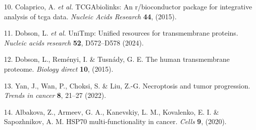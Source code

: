 \documentclass[
]{article}
\newenvironment{cslreferences}%
  {}%
  {\par}
\begin{document}
\begin{cslreferences}
\leavevmode\hypertarget{ref-TcgabiolinksAColapr2015}{}%
10. Colaprico, A. \emph{et al.} TCGAbiolinks: An r/bioconductor package for integrative analysis of tcga data. \emph{Nucleic Acids Research} \textbf{44}, (2015).

\leavevmode\hypertarget{ref-UnitmpUnifiedDobson2024}{}%
11. Dobson, L. \emph{et al.} UniTmp: Unified resources for transmembrane proteins. \emph{Nucleic acids research} \textbf{52}, D572--D578 (2024).

\leavevmode\hypertarget{ref-TheHumanTransDobson2015}{}%
12. Dobson, L., Reményi, I. \& Tusnády, G. E. The human transmembrane proteome. \emph{Biology direct} \textbf{10}, (2015).

\leavevmode\hypertarget{ref-NecroptosisAndYanJ2022}{}%
13. Yan, J., Wan, P., Choksi, S. \& Liu, Z.-G. Necroptosis and tumor progression. \emph{Trends in cancer} \textbf{8}, 21--27 (2022).

\leavevmode\hypertarget{ref-Hsp70MultiFunAlbako2020}{}%
14. Albakova, Z., Armeev, G. A., Kanevskiy, L. M., Kovalenko, E. I. \& Sapozhnikov, A. M. HSP70 multi-functionality in cancer. \emph{Cells} \textbf{9}, (2020).
\end{cslreferences}
\end{document}
